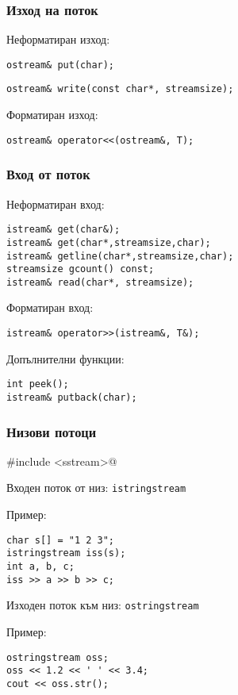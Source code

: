 \documentclass{beamer}
\begin{document}
\begin{frame}[fragile]
  \frametitle{Изход на поток}

  Неформатиран изход:
  \vspace{1em}

  \verb#ostream& put(char);#

  \verb#ostream& write(const char*, streamsize);#

  \vspace{3em}

  Форматиран изход:
  \vspace{1em}
  
  \verb#ostream& operator<<(ostream&, T);#
\end{frame}

\begin{frame}[fragile]
  \frametitle{Вход от поток}

  Неформатиран вход:
  \vspace{1em}

  \verb#istream& get(char&);#\\
  \verb#istream& get(char*,streamsize,char);#\\
  \verb#istream& getline(char*,streamsize,char);#\\
  \verb#streamsize gcount() const;#\\
  \verb#istream& read(char*, streamsize);#
  \vspace{2em}

  Форматиран вход:
  \vspace{1em}

  \verb#istream& operator>>(istream&, T&);#  

  \vspace{2em}

  Допълнителни функции:

  \verb#int peek();#\\
  \verb#istream& putback(char);#
\end{frame}

\begin{frame}[fragile]
  \frametitle{Низови потоци}
  
  \verb@#include <sstream>@
  \vspace{1em}

  Входен поток от низ: \tt{istringstream}
  \vspace{1em}

  Пример:
\begin{verbatim}
char s[] = "1 2 3";
istringstream iss(s);
int a, b, c;
iss >> a >> b >> c;
\end{verbatim}
  \vspace{1em}

  Изходен поток към низ: \tt{ostringstream}
  \vspace{1em}
  
  Пример:
\begin{verbatim}
ostringstream oss;
oss << 1.2 << ' ' << 3.4;
cout << oss.str();
\end{verbatim}
\end{frame}
\end{document}
